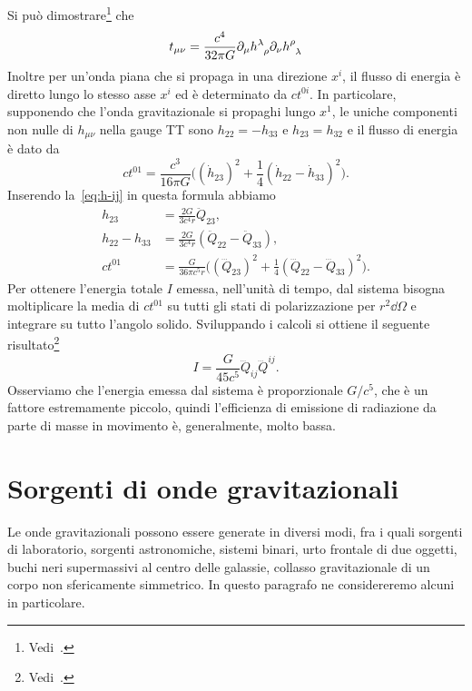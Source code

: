 Si può dimostrare\footnote{Vedi~\textcite[449]{landau:campi}.} che
\begin{equation}
  t_{\mu\nu} = \frac{c^{4}}{32\pi G} \partial_{\mu}
  \tensor{h}{^{\lambda}_{\rho}} \partial_{\nu} \tensor{h}{^{\rho}_{\lambda}}
\end{equation}
Inoltre per un'onda piana che si propaga in una direzione $x^{i}$, il flusso di
energia è diretto lungo lo stesso asse $x^{i}$ ed è determinato da $ct^{0i}$.
In particolare, supponendo che l'onda gravitazionale si propaghi lungo $x^{1}$,
le uniche componenti non nulle di $h_{\mu\nu}$ nella gauge TT sono
$h_{22} = -h_{33}$ e $h_{23} = h_{32}$ e il flusso di energia è dato da
\begin{equation}
  ct^{01} = \frac{c^{3}}{16\pi G}\bigg((\dot{h}_{23})^{2} +
  \frac{1}{4}(\dot{h}_{22} - \dot{h}_{33})^{2}\bigg).
\end{equation}
Inserendo la~\eqref{eq:h-ij} in questa formula abbiamo
\begin{subequations}
  \begin{align}
    h_{23} &= \frac{2G}{3c^{4}r} \ddot{Q}_{23}, \\
    h_{22} - h_{33} &= \frac{2G}{3c^{4}r}(\ddot{Q}_{22} - \ddot{Q}_{33}), \\
    ct^{01} &= \frac{G}{36\pi c^{5}r}\bigg((\dddot{Q}_{23})^{2} +
    \frac{1}{4}(\dddot{Q}_{22} - \dddot{Q}_{33})^{2}\bigg).
  \end{align}
\end{subequations}
Per ottenere l'energia totale $I$ emessa, nell'unità di tempo, dal sistema
bisogna moltiplicare la media di $ct^{01}$ su tutti gli stati di polarizzazione
per $r^{2}\dd\Omega$ e integrare su tutto l'angolo solido.  Sviluppando i
calcoli si ottiene il seguente
risultato\footnote{Vedi~\textcite[460-461]{landau:campi}.}
\begin{equation}
  I = \frac{G}{45c^{5}} \dddot{Q}_{ij} \dddot{Q}^{ij}.
\end{equation}
Osserviamo che l'energia emessa dal sistema è proporzionale $G/c^{5}$, che è un
fattore estremamente piccolo, quindi l'efficienza di emissione di radiazione da
parte di masse in movimento è, generalmente, molto bassa.

\section{Sorgenti di onde gravitazionali}
\label{sec:sorgenti-onde-grav}

Le onde gravitazionali possono essere generate in diversi modi, fra i quali
sorgenti di laboratorio, sorgenti astronomiche, sistemi binari, urto frontale di
due oggetti, buchi neri supermassivi al centro delle galassie, collasso
gravitazionale di un corpo non sfericamente simmetrico.  In questo paragrafo ne
considereremo alcuni in particolare.


